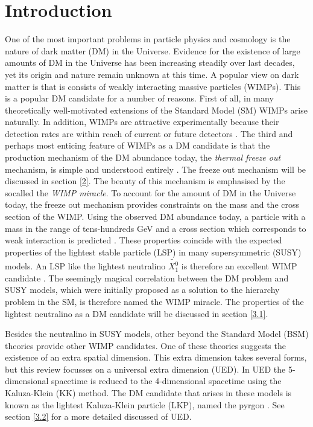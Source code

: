\section{Introduction}

One of the most important problems in particle physics and cosmology is the nature of dark matter (DM) in the Universe. Evidence for the existence of large amounts of DM in the Universe has been increasing steadily over last decades, yet its origin and nature remain unknown at this time. A popular view on dark matter is that is consists of weakly interacting massive particles (WIMPs). This is a popular DM candidate for a number of reasons. First of all, in many theoretically well-motivated extensions of the Standard Model (SM) WIMPs arise naturally. In addition, WIMPs are attractive experimentally because their detection rates are within reach of current or future detectors \cite{Roszkowski:2017nbc}.
The third and perhaps most enticing feature of WIMPs as a DM candidate is that the production mechanism of the DM abundance today, the \textit{thermal freeze out} mechanism, is simple and understood entirely \cite{Bertone:2017adx}. The freeze out mechanism will be discussed in section \ref{2}. The beauty of this mechanism is emphasised by the socalled the \textit{WIMP miracle}. To account for the amount of DM in the Universe today, the freeze out mechanism provides constraints on the mass and the cross section of the WIMP. Using the observed DM abundance today, a particle with a mass in the range of tens-hundreds GeV and a cross section which corresponds to weak interaction is predicted \cite{Khlopov:2018ttr}. These properties coincide with the expected properties of the lightest stable particle (LSP) in many supersymmetric (SUSY) models. An LSP like the lightest neutralino $\tilde{X^0_1}$ is therefore an excellent WIMP candidate \cite{Cerdeno:2009zz}. The seemingly magical correlation between the DM problem and SUSY models, which were initially proposed as a solution to the hierarchy problem in the SM, is therefore named the WIMP miracle. The properties of the lightest neutralino as a DM candidate will be discussed in section \ref{3.1}.

Besides the neutralino in SUSY models, other beyond the Standard Model (BSM) theories provide other WIMP candidates. One of these theories suggests the existence of an extra spatial dimension. This extra dimension takes several forms, but this review focusses on a universal extra dimension (UED). In UED the 5-dimensional spacetime is reduced to the 4-dimensional spacetime using the Kaluza-Klein (KK) method. The DM candidate that arises in these models is known as the lightest Kaluza-Klein particle (LKP), named the pyrgon \cite{Kolb:1983fm}. See section \ref{3.2} for a more detailed discussed of UED. 

